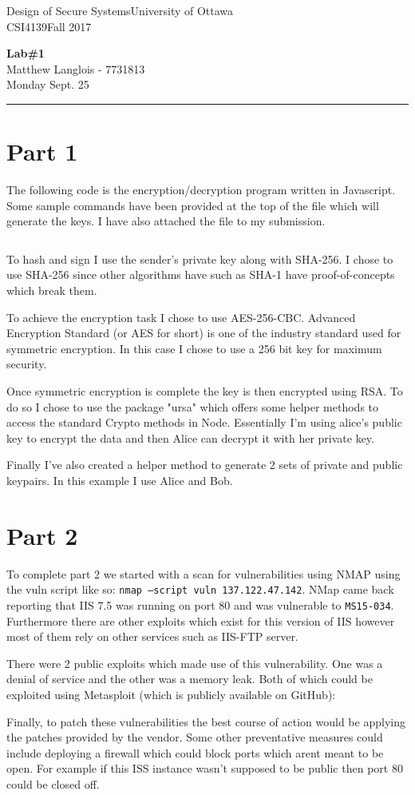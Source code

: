 \documentclass[fleqn, 12pt]{article}
\newcommand{\university}{University of Ottawa}
\newcommand{\name}{Matthew Langlois}
\newcommand{\studentNumber}{7731813}
\newcommand{\semester}{Fall 2017}
\newcommand{\assignmentType}{Lab}
\newcommand{\assignemntNumber}{1}
\newcommand{\dueDate}{Monday Sept. 25}
\newcommand{\courseCode}{CSI4139}
\newcommand{\courseTitle}{Design of Secure Systems}
\newcommand{\code}[1]{\colorbox{codegray}{\texttt{#1}}}
\newcommand{\codefile}{\inputminted}
\newcommand{\makeheader}{
    \noindent
    \courseTitle \hfill \university\\
    \courseCode \hfill \semester
    \begin{center}
        \textbf{\assignmentType \#\assignemntNumber}\\
        \name \hspace{1pt} - \studentNumber\\
        \dueDate\\
    \end{center}
    \vspace{6pt}
    \hrule
}
\begin{document}
\thispagestyle{firstpage}
\makeheader

\section*{Part 1}

The following code is the encryption/decryption program written in Javascript. Some sample commands have been provided at the top of the file which will generate the keys. I have also attached the file to my submission.

\codefile{javascript}{lab.js}

To hash and sign I use the sender's private key along with SHA-256. I chose to use SHA-256 since other algorithms have such as SHA-1 have proof-of-concepts which break them.

To achieve the encryption task I chose to use AES-256-CBC. Advanced Encryption Standard (or AES for short) is one of the industry standard used for symmetric encryption. In this case I chose to use a 256 bit key for maximum security.

Once symmetric encryption is complete the key is then encrypted using RSA. To do so I chose to use the package "ursa" which offers some helper methods to access the standard Crypto methods in Node. Essentially I'm using alice's public key to encrypt the data and then Alice can decrypt it with her private key.


Finally I've also created a helper method to generate 2 sets of private and public keypairs. In this example I use Alice and Bob.

\section*{Part 2}

To complete part 2 we started with a scan for vulnerabilities using NMAP using the vuln script like so: \code{nmap --script vuln 137.122.47.142}. NMap came back reporting that IIS 7.5 was running on port 80 and was vulnerable to \code{MS15-034}. Furthermore there are other exploits which exist for this version of IIS however most of them rely on other services such as IIS-FTP server.

There were 2 public exploits which made use of this vulnerability. One was a denial of service and the other was a memory leak. Both of which could be exploited using Metasploit (which is publicly available on GitHub):


Finally, to patch these vulnerabilities the best course of action would be applying the patches provided by the vendor. Some other preventative measures could include deploying a firewall which could block ports which arent meant to be open. For example if this ISS instance wasn't supposed to be public then port 80 could be closed off.
\end{document}
